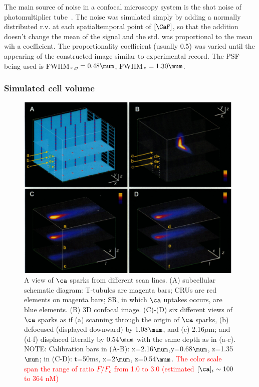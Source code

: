 The main source of noise in a confocal microscopy system is the shot noise of
photomultiplier tube~\citep{sheppard1992}. The noise was simulated simply by adding a normally
distributed r.v. at each spatialtemporal point of $[\CaF]$, so that the addition
doesn't change the mean of the signal and the std. was proportional to the mean
wih a coefficient. The proportionality coefficient (usually 0.5) was varied
until the appearing of the constructed image similar to experimental record. The
PSF being used is FWHM$_{x,y}=0.48\mum$, FWHM$_z=1.30\mum$.
 
\subsubsection{Simulated cell volume}
\label{sec:simul-cell-volume}



\begin{figure}[ht]
  \centerline{\includegraphics[height=9cm,
    angle=0]{./images/pratusevich_spark2.eps}}
  \caption{A view of $\ca$ sparks from different scan lines. (A)
    subcellular schematic diagram: T-tubules are magenta bars; CRUs
    are red elements on magenta bars; SR, in which $\ca$ uptakes
    occurs, are blue elements. (B) 3D confocal image. (C)-(D) six
    different views of $\ca$ sparks as if (a) scanning through the
    origin of $\ca$ sparks, (b) defocused (displayed downward) by
    1.08$\mum$, and (c) 2.16$\mu$m; and (d-f) displaced literally by
    0.54$\mum$ with the same depth as in (a-c). NOTE: Calibration bars in
    (A-B): x=2.16$\mum$,y=0.68$\mum$, z=1.35$\mum$; in (C-D): t=50ms,
    x=2$\mum$, z=0.54$\mum$.
    \textcolor{red}{The color scale span the range of ratio $F/F_o$
      from 1.0 to 3.0 (estimated $[\ca]_i \sim 100$ to 364 nM)}}
  \label{fig:pratusevich_spark2}
\end{figure}
\clearpage

